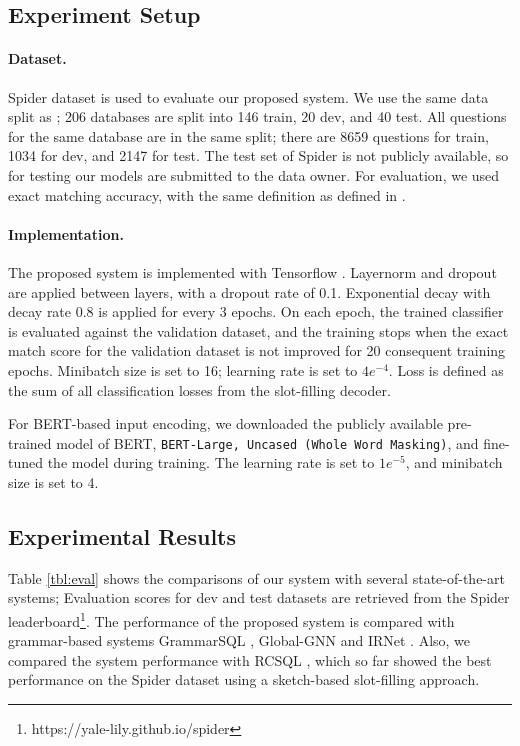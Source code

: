 \documentclass[11pt,a4paper]{article}
\begin{document}
\subsection{Experiment Setup}
\paragraph{Dataset.} Spider dataset \citep{Yu:18} is used to evaluate our proposed system. We use the same data split as \citet{Yu:18}; 206 databases are split into 146 train, 20 dev, and 40 test. All questions for the same database are in the same split; there are 8659 questions for train, 1034 for dev, and 2147 for test. The test set of Spider is not publicly available, so for testing our models are submitted to the data owner. For evaluation, we used exact matching accuracy, with the same definition as defined in \citet{Yu:18}.
\paragraph{Implementation.}
The proposed system is implemented with Tensorflow \citep{tensorflow2015-whitepaper}. Layernorm \citep{layernorm} and dropout \citep{dropout} are applied between layers, with a dropout rate of 0.1. Exponential decay with decay rate 0.8 is applied for every 3 epochs. On each epoch, the trained classifier is evaluated against the validation dataset, and the training stops when the exact match score for the validation dataset is not improved for 20 consequent training epochs. Minibatch size is set to 16; learning rate is set to $4e^{-4}$. Loss is defined as the sum of all classification losses from the slot-filling decoder.

For BERT-based input encoding, we downloaded the publicly available pre-trained model of BERT, \texttt{BERT-Large, Uncased (Whole Word Masking)}, and fine-tuned the model during training. The learning rate is set to $1e^{-5}$, and minibatch size is set to 4.

\subsection{Experimental Results}

Table \ref{tbl:eval} shows the comparisons of our system with several state-of-the-art systems; Evaluation scores for dev and test datasets are retrieved from the Spider leaderboard\footnote{https://yale-lily.github.io/spider}. The performance of the proposed system is compared with grammar-based systems GrammarSQL \citep{grammarsql}, Global-GNN \citep{gnn} and IRNet \citep{irnet}. Also, we compared the system performance with RCSQL \citep{rcsql}, which so far showed the best performance on the Spider dataset using a sketch-based slot-filling approach.
\end{document}
